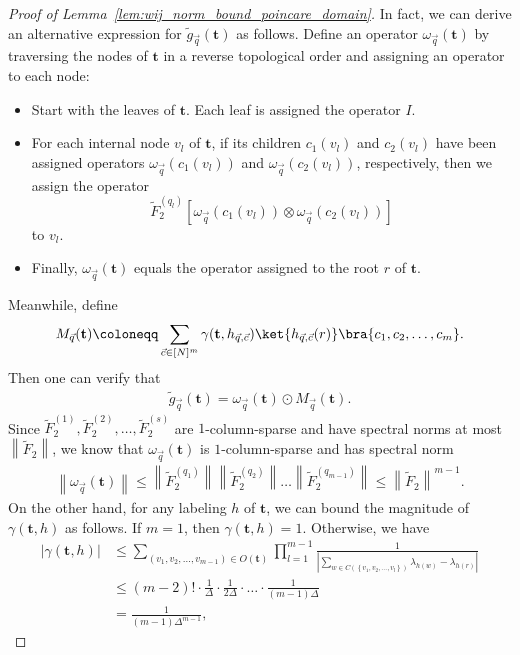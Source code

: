 \documentclass[superscriptaddress,onecolumn,nofootinbib,longbibliography,a4paper,accepted=2026-09-29]{quantumarticle}
\theoremstyle{plain}
\theoremstyle{definition}
\numberwithin{thm}{section}
\numberwithin{assumption}{section}
\numberwithin{lemma}{section}
\numberwithin{prop}{section}
\numberwithin{cor}{section}
\numberwithin{definition}{section}
\numberwithin{rmk}{section}
\numberwithin{equation}{section}
\newcommand{\abs}[1]      {\left| #1 \right|}
\newcommand{\norm}[1]     {\left\| #1 \right\|}
\newcommand{\lrsb}[1]{\left [ #1 \right ]}
\newcommand{\lrcb}[1]{\left \{ #1 \right \}}
\newcommand{\defeq}{\coloneqq}
\newcommand{\mbt}{\mathbf{t}}
\begin{document}
\begin{proof} [Proof of Lemma~\ref{lem:wij_norm_bound_poincare_domain}]
In fact, we can derive an alternative expression for $\tilde{g}_{\vec q}(\mbt)$ as follows.
Define an operator $\omega_{\vec q}(\mbt)$ by traversing the nodes of $\mbt$ in a reverse topological order and assigning an operator to each node:
\begin{itemize}
    \item Start with the leaves of $\mbt$. Each leaf is assigned the operator $I$.
    \item For each internal node $v_l$ of $\mbt$, if its children $c_1(v_l)$ and $c_2(v_l)$ have been assigned operators $\omega_{\vec q}(c_1(v_l))$ and 
    $\omega_{\vec q}(c_2(v_l))$, respectively, then we assign the operator $$\tilde{F}_2^{(q_l)} \lrsb{\omega_{\vec q}(c_1(v_l)) \otimes \omega_{\vec q}(c_2(v_l))}$$ 
    to $v_l$.
    \item Finally, $\omega_{\vec q}(\mbt)$ equals the operator assigned to the root $r$ of $\mbt$.
\end{itemize}
Meanwhile, define  
\begin{align}
    M_{\vec q}(\mbt) \defeq  \sum_{\vec c \in [N]^m} \gamma(\mbt, h_{\vec q, \vec c}) \ket{h_{\vec q, \vec c}(r)}\bra{c_1,c_2,\dots,c_m}.
\end{align}
Then one can verify that
\begin{align}
    \tilde{g}_{\vec q}(\mbt) = \omega_{\vec q}(\mbt) \odot M_{\vec q}(\mbt).
\end{align}
Since $\tilde{F}_2^{(1)}, \tilde{F}_2^{(2)}, \dots, \tilde{F}_2^{(s)}$ are $1$-column-sparse and have spectral norms at most $\norm{\tilde{F}_2}$, we know that $\omega_{\vec q}(\mbt)$ is 
$1$-column-sparse and has spectral norm
\begin{align}
    \norm{\omega_{\vec q}(\mbt)} \le \norm{\tilde{F}_2^{(q_1)}}\norm{\tilde{F}_2^{(q_2)}}\dots \norm{\tilde{F}_2^{(q_{m-1})}} \le \norm{\tilde{F}_2}^{m-1}.
\end{align}
On the other hand, for any labeling $h$ of $\mbt$, we can bound the magnitude of $\gamma(\mbt, h)$ as follows. If $m=1$, then $\gamma(\mbt, h)=1$. Otherwise, we have
\begin{align}
\abs{\gamma(\mbt, h)} &\le  \sum_{(v_1,v_2,\dots,v_{m-1}) \in O(\mbt)} \prod_{l=1}^{m-1}\frac{1}{\abs{\sum_{w \in C(\lrcb{v_1,v_2,\dots,v_l})} \lambda_{h(w)} -\lambda_{h(r)}}} \\
&\le (m-2)! \cdot \frac{1}{\Delta} \cdot \frac{1}{2\Delta}  \cdot \dots \cdot 
\frac{1}{(m-1)\Delta} \\
&=\frac{1}{(m-1)\Delta^{m-1}},
\end{align}

\end{proof}
\end{document}
